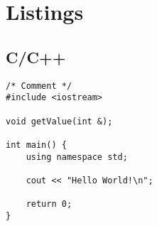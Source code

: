 \documentclass{swddoc}
\begin{document}
\section{Listings}

\subsection{C/C++}

\begin{lstlisting}[style=swd_cpp_lst_style]
/* Comment */
#include <iostream>

void getValue(int &);

int main() {
	using namespace std;

	cout << "Hello World!\n";
	
	return 0;
}
\end{lstlisting}
\end{document}
